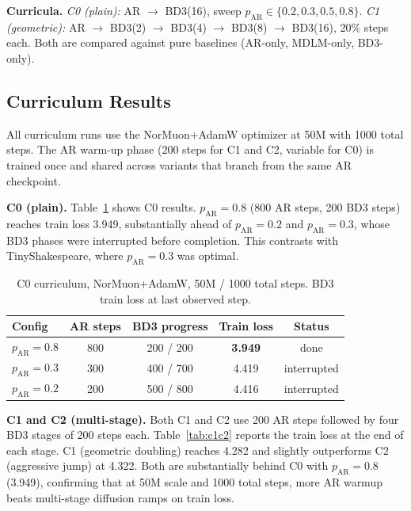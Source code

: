 \documentclass{article}
\begin{document}
\textbf{Curricula.}
\emph{C0 (plain):} AR $\to$ BD3(16), sweep
$p_{\mathrm{AR}} \in \{0.2, 0.3, 0.5, 0.8\}$.
\emph{C1 (geometric):}
AR $\to$ BD3(2) $\to$ BD3(4) $\to$ BD3(8) $\to$ BD3(16), 20\%
steps each.
Both are compared against pure baselines (AR-only, MDLM-only, BD3-only).


\subsection{Curriculum Results}
\label{sec:climbmix_results}

All curriculum runs use the NorMuon+AdamW optimizer at 50M with 1000 total
steps.  The AR warm-up phase (200 steps for C1 and C2, variable for C0) is
trained once and shared across variants that branch from the same AR
checkpoint.

\textbf{C0 (plain).}
Table~\ref{tab:c0_early} shows C0 results.
$p_{\mathrm{AR}} = 0.8$ (800 AR steps, 200 BD3 steps) reaches train loss
3.949, substantially ahead of $p_{\mathrm{AR}} = 0.2$ and
$p_{\mathrm{AR}} = 0.3$, whose BD3 phases were interrupted before
completion.  This contrasts with TinyShakespeare, where
$p_{\mathrm{AR}} = 0.3$ was optimal.

\begin{table}[h]
\centering
\caption{C0 curriculum, NorMuon+AdamW, 50M / 1000 total steps.
BD3 train loss at last observed step.}
\label{tab:c0_early}
\vspace{2pt}
\small
\begin{tabular}{lcccc}
\toprule
Config & AR steps & BD3 progress & Train loss & Status \\
\midrule
$p_{\mathrm{AR}}{=}0.8$ & 800 & 200 / 200 & \textbf{3.949} & done \\
$p_{\mathrm{AR}}{=}0.3$ & 300 & 400 / 700 & 4.419 & interrupted \\
$p_{\mathrm{AR}}{=}0.2$ & 200 & 500 / 800 & 4.416 & interrupted \\
\bottomrule
\end{tabular}
\vspace{-8pt}
\end{table}

\textbf{C1 and C2 (multi-stage).}
Both C1 and C2 use 200 AR steps followed by four BD3 stages of 200 steps
each.  Table~\ref{tab:c1c2} reports the train loss at the end of each stage.
C1 (geometric doubling) reaches 4.282 and slightly outperforms C2 (aggressive
jump) at 4.322.  Both are substantially behind C0 with $p_{\mathrm{AR}}{=}0.8$
(3.949), confirming that at 50M scale and 1000 total steps, more AR warmup
beats multi-stage diffusion ramps on train loss.
\end{document}
